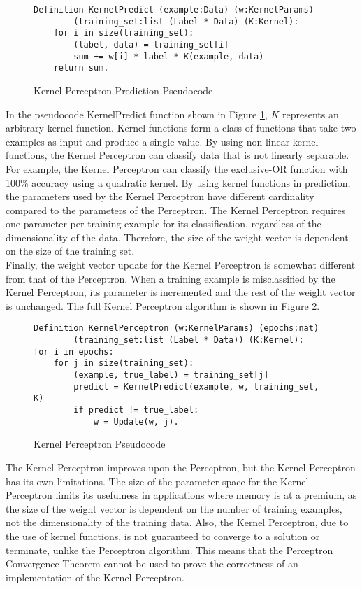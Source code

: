 \begin{figure}
    \caption{Kernel Perceptron Prediction Pseudocode}
    \label{KernelPerceptronPredictPseudo}
    \begin{lstlisting}
Definition KernelPredict (example:Data) (w:KernelParams) 
        (training_set:list (Label * Data) (K:Kernel):
    for i in size(training_set):
        (label, data) = training_set[i]
        sum += w[i] * label * K(example, data)
    return sum.
    \end{lstlisting}
\end{figure}

In the pseudocode KernelPredict function shown in Figure \ref{KernelPerceptronPredictPseudo}, $K$ represents an arbitrary kernel function. Kernel functions form a class of functions that take two examples as input and produce a single value. By using non-linear kernel functions, the Kernel Perceptron can classify data that is not linearly separable. For example, the Kernel Perceptron can classify the exclusive-OR function with 100\% accuracy
using a quadratic kernel. By using kernel functions in prediction, the parameters used by the Kernel Perceptron have different cardinality compared to the parameters of the Perceptron. The Kernel Perceptron requires one parameter per training example for its classification, regardless of the dimensionality of the data. Therefore, the size of the weight vector is dependent on the size of the training set. 
\\Finally, the weight vector update for the Kernel Perceptron is somewhat different from that of the Perceptron. When a training example is misclassified by the Kernel Perceptron, its parameter is incremented and the rest of the weight vector is unchanged. The full Kernel Perceptron algorithm is shown in Figure \ref{KernelPerceptronPseodo}.

\begin{figure}
    \caption{Kernel Perceptron Pseudocode}
    \label{KernelPerceptronPseodo}
    \begin{lstlisting}
Definition KernelPerceptron (w:KernelParams) (epochs:nat)
        (training_set:list (Label * Data)) (K:Kernel):
for i in epochs:
    for j in size(training_set):
        (example, true_label) = training_set[j]
        predict = KernelPredict(example, w, training_set, K)
        if predict != true_label:
            w = Update(w, j).
    \end{lstlisting}
\end{figure}

The Kernel Perceptron improves upon the Perceptron, but the Kernel Perceptron has its own limitations. The size of the parameter space for the Kernel Perceptron limits its usefulness in applications where memory is at a premium, as the size of the weight vector is dependent on the number of training examples, not the dimensionality of the training data. Also, the Kernel Perceptron, due to the use of kernel functions, is not guaranteed to converge to a solution or terminate, unlike the Perceptron algorithm. This means that the Perceptron Convergence Theorem cannot be used to prove the correctness of an implementation of the Kernel Perceptron.
